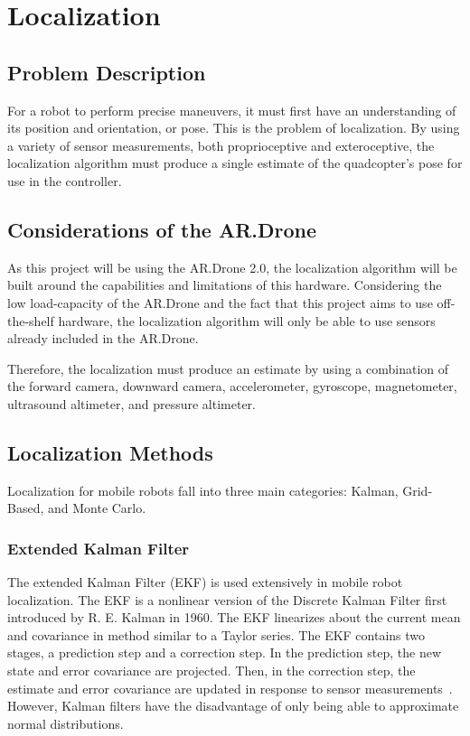 
\chapter{Localization\label{ch:localization}}

\section{Problem Description}
	For a robot to perform precise maneuvers, it must first have an understanding of its position and orientation, or pose. This is the problem of localization. By using a variety of sensor measurements, both proprioceptive and exteroceptive, the localization algorithm must produce a single estimate of the quadcopter's pose for use in the controller.

\section{Considerations of the AR.Drone}

	As this project will be using the AR.Drone 2.0, the localization algorithm will be built around the capabilities and limitations of this hardware. Considering the low load-capacity of the AR.Drone and the fact that this project aims to use off-the-shelf hardware, the localization algorithm will only be able to use sensors already included in the AR.Drone.

	Therefore, the localization must produce an estimate by using a combination of the forward camera, downward camera, accelerometer, gyroscope, magnetometer, ultrasound altimeter, and pressure altimeter. 

\section{Localization Methods}

	Localization for mobile robots fall into three main categories: Kalman, Grid-Based, and Monte Carlo.

	\subsection{Extended Kalman Filter}
	The extended Kalman Filter (EKF) is used extensively in mobile robot localization. The EKF is a nonlinear version of the Discrete Kalman Filter first introduced by R. E. Kalman in 1960. The EKF linearizes about the current mean and covariance in  method similar to a Taylor series. The EKF contains two stages, a prediction step and a correction step. In the prediction step, the new state and error covariance are projected. Then, in the correction step, the estimate and error covariance are updated in response to sensor measurements~\cite{Welch}. However, Kalman filters have the disadvantage of only being able to approximate normal distributions.

